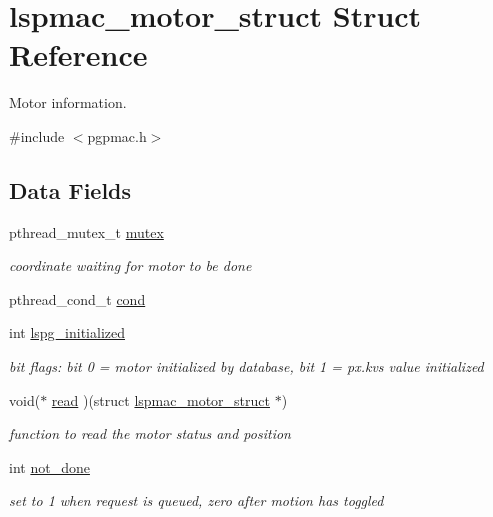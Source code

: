 \hypertarget{structlspmac__motor__struct}{
\section{lspmac\_\-motor\_\-struct Struct Reference}
\label{structlspmac__motor__struct}
}


Motor information.  


{\ttfamily \#include $<$pgpmac.h$>$}\subsection*{Data Fields}
\begin{DoxyCompactItemize}
\item 
pthread\_\-mutex\_\-t \hyperlink{structlspmac__motor__struct_a188c5b1e991750ce2ffd53e0192e0907}{mutex}
\begin{DoxyCompactList}\small\item\em coordinate waiting for motor to be done \item\end{DoxyCompactList}\item 
pthread\_\-cond\_\-t \hyperlink{structlspmac__motor__struct_aa0ea4108b8fed5b41ff91ca7266f3d84}{cond}
\item 
int \hyperlink{structlspmac__motor__struct_af11e5f75c1cf88ed6842d04154d27a31}{lspg\_\-initialized}
\begin{DoxyCompactList}\small\item\em bit flags: bit 0 = motor initialized by database, bit 1 = px.kvs value initialized \item\end{DoxyCompactList}\item 
void($\ast$ \hyperlink{structlspmac__motor__struct_ac62692eb939c04ca35e939d1c3acfe8f}{read} )(struct \hyperlink{structlspmac__motor__struct}{lspmac\_\-motor\_\-struct} $\ast$)
\begin{DoxyCompactList}\small\item\em function to read the motor status and position \item\end{DoxyCompactList}\item 
int \hyperlink{structlspmac__motor__struct_ab7bd8bff48953ce05c758598d75877ac}{not\_\-done}
\begin{DoxyCompactList}\small\item\em set to 1 when request is queued, zero after motion has toggled \item\end{DoxyCompactList}\item 

\end{DoxyCompactItemize}
